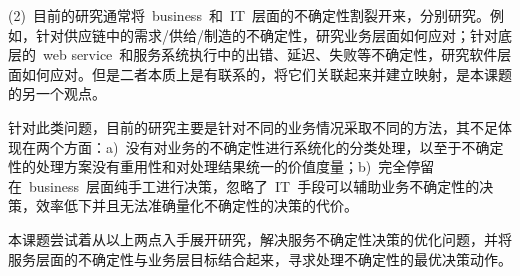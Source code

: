 (2)~目前的研究通常将~business~和~IT~层面的不确定性割裂开来，分别研究。例如，针对供应链中的需求/供给/制造的不确定性，研究业务层面如何应对；针对底层的~web service~和服务系统执行中的出错、延迟、失败等不确定性，研究软件层面如何应对。但是二者本质上是有联系的，将它们关联起来并建立映射，是本课题的另一个观点。

针对此类问题，目前的研究主要是针对不同的业务情况采取不同的方法，其不足体现在两个方面：a)~没有对业务的不确定性进行系统化的分类处理，以至于不确定性的处理方案没有重用性和对处理结果统一的价值度量；b)~完全停留在~business~层面纯手工进行决策，忽略了~IT~手段可以辅助业务不确定性的决策，效率低下并且无法准确量化不确定性的决策的代价。

本课题尝试着从以上两点入手展开研究，解决服务不确定性决策的优化问题，并将服务层面的不确定性与业务层目标结合起来，寻求处理不确定性的最优决策动作。




